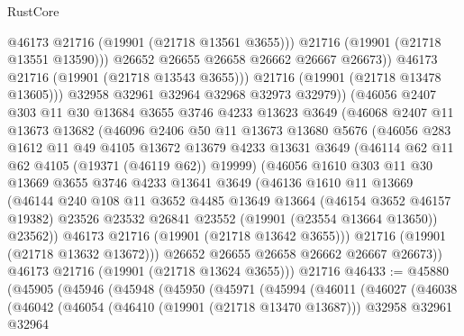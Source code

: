 \begin{lexlean}{RustCore}
\begin{coremodule}
                    @46173
                    @21716
                    (@19901 (@21718 @13561 @3655)))
                  @21716
                  (@19901 (@21718 @13551 @13590)))
                @26652
                @26655
                @26658
                @26662
                @26667
                @26673))
            @46173
            @21716
            (@19901 (@21718 @13543 @3655)))
          @21716
          (@19901 (@21718 @13478 @13605)))
        @32958
        @32961
        @32964
        @32968
        @32973
        @32979))
    (@46056
      @2407
      @303
      @11
      @30
      @13684
      @3655
      @3746
      @4233
      @13623
      @3649
      (@46068
        @2407
        @11
        @13673
        @13682
        (@46096
          @2406
          @50
          @11
          @13673
          @13680
          @5676
          (@46056
            @283
            @1612
            @11
            @49
            @4105
            @13672
            @13679
            @4233
            @13631
            @3649
            (@46114 @62 @11 @62 @4105 (@19371 (@46119 @62)) @19999)
            (@46056
              @1610
              @303
              @11
              @30
              @13669
              @3655
              @3746
              @4233
              @13641
              @3649
              (@46136
                @1610
                @11
                @13669
                (@46144
                  @240
                  @108
                  @11
                  @3652
                  @4485
                  @13649
                  @13664
                  (@46154 @3652 @46157 @19382)
                  @23526
                  @23532
                  @26841
                  @23552
                  (@19901 (@23554 @13664 @13650))
                  @23562))
              @46173
              @21716
              (@19901 (@21718 @13642 @3655)))
            @21716
            (@19901 (@21718 @13632 @13672)))
          @26652
          @26655
          @26658
          @26662
          @26667
          @26673))
      @46173
      @21716
      (@19901 (@21718 @13624 @3655)))
    @21716
@46433 := @45880
    (@45905
      (@45946
        (@45948
          (@45950
            (@45971
              (@45994
                (@46011
                  (@46027
                    (@46038
                      (@46042
                        (@46054
                          (@46410 (@19901 (@21718 @13470 @13687)))
                          @32958
                          @32961
                          @32964

\end{coremodule}
\end{lexlean}
